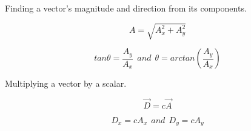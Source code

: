 \documentclass[]{beamer}
\begin{document}
\begin{frame}



\vspace{5mm}

Finding a vector’s magnitude and direction from its components.
\vspace{5mm}

\begin{equation}
A=\sqrt{A^2_x+A^2_y}
\end{equation}

\begin{equation}
tan \theta =\frac{A_y}{A_x} \ \ and \ \ \theta =arctan (\frac{A_y}{A_x})
\end{equation}

 \end{frame}



\begin{frame}




Multiplying a vector by a scalar.

\begin{equation}
\vec{D}=c\vec{A}
\end{equation}

\begin{equation}
D_x =c{A_x} \ \ and \ \ D_y =c{A_y}
\end{equation}


 \end{frame}
\end{document}
